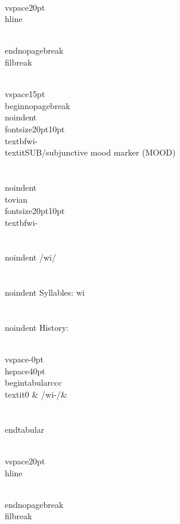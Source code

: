 \\vspace{20pt}\\hline

\\end{nopagebreak}
\\filbreak



\\vspace{15pt}
\\begin{nopagebreak}
\\noindent{\\fontsize{20pt}{10pt}\\textbf{wi-} } \\textit{SUB/subjunctive mood marker} (MOOD)\\\\
\\noindent {\\tovian \\fontsize{20pt}{10pt} \\textbf{wi-} }\\\\
\\noindent /w{\textprimstress}i/\\\\
\\noindent Syllables: wi\\\\


\\noindent History:

\\vspace{-0pt}
\\hspace{40pt}
\\begin{tabular}{ccc}
\\textit{0} & /wi-/& \\\\
\\end{tabular}

\\vspace{20pt}\\hline

\\end{nopagebreak}
\\filbreak



